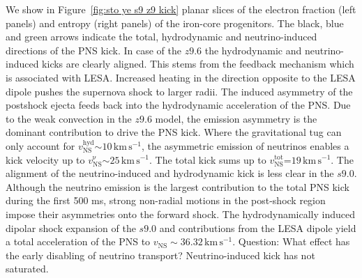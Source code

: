 \documentclass[fleqn,usenatbib]{mnras}
\newcommand{\kms}{\ensuremath{\mathrm{km\, s^{-1}}}}
\newcommand{\COM}[1]{{\color{orange}#1}}
\begin{document}
We show in Figure~\ref{fig:sto ye s9 z9 kick} planar slices of the electron fraction (left panels) and entropy (right panels) of the iron-core progenitors. The black, blue and green arrows indicate the total, hydrodynamic and neutrino-induced directions of the PNS kick. In case of the $z9.6$ the hydrodynamic and neutrino-induced kicks are clearly aligned. This stems from the feedback mechanism which is associated with LESA. Increased heating in the direction opposite to the LESA dipole pushes the supernova shock to larger radii. The induced asymmetry of the postshock ejecta feeds back into the hydrodynamic acceleration of the PNS. Due to the weak convection in the $z9.6$ model, the emission asymmetry is the dominant contribution to drive the PNS kick. 
Where the gravitational tug can only account for  $v_{\mathrm{NS}}^{\mathrm{hyd}}\mathord{\sim}10\,\kms$, the asymmetric emission of neutrinos enables a kick velocity up to $v_{\mathrm{NS}}^{\mathrm{\nu}}\mathord{\sim}25\,\kms$. The total kick sums up to $v_{\mathrm{NS}}^{\mathrm{tot}}\mathord{=}19\,\kms$.
The alignment of the neutrino-induced and hydrodynamic kick is less clear in the $s9.0$. Although the neutrino emission is the largest contribution to the total PNS kick during the first 500 ms, strong non-radial motions in the post-shock region impose their asymmetries onto the forward shock. 
The hydrodynamically induced dipolar shock expansion of the $s9.0$ and contributions from the LESA dipole yield a total acceleration of the PNS to $v_{\mathrm{NS}}\mathrm{\sim}36.32\,\kms$.
\COM{Question: What effect has the early disabling of neutrino transport? Neutrino-induced kick has not saturated. }
\end{document}
